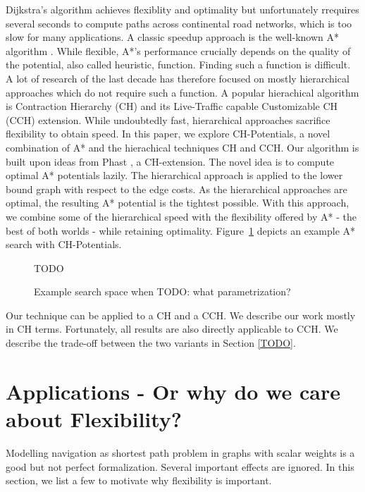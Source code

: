 \documentclass[a4paper,UKenglish,cleveref, autoref]{lipics-v2019}
\begin{document}
Dijkstra's algorithm \cite{?} achieves flexiblity and optimality but unfortunately rrequires several seconds to compute paths across continental road networks, which is too slow for many applications.
A classic speedup approach is the well-known A* algorithm \cite{hnr-afbhd-68}.
While flexible, A*'s performance crucially depends on the quality of the potential, also called heuristic, function.
Finding such a function is difficult.
A lot of research of the last decade has therefore focused on mostly hierarchical approaches \cite{CH,CCH,CRP,HIGHWAYHIERACHIES,MLD} which do not require such a function.
A popular hierachical algorithm is Contraction Hierarchy (CH) \cite{?} and its Live-Traffic capable Customizable CH (CCH) \cite{?} extension.
While undoubtedly fast, hierarchical approaches sacrifice flexibility to obtain speed.
In this paper, we explore CH-Potentials, a novel combination of A* and the hierachical techniques CH and CCH.
Our algorithm is built upon ideas from Phast \cite{?}, a CH-extension.
The novel idea is to compute optimal A* potentials lazily.
The hierarchical approach is applied to the lower bound graph with respect to the edge costs.
As the hierarchical approaches are optimal, the resulting A* potential is the tightest possible.
With this approach, we combine some of the hierarchical speed with the flexibility offered by A* - the best of both worlds - while retaining optimality.
Figure~\ref{img:search-space} depicts an example  A* search with CH-Potentials.

\begin{figure}
TODO

\caption{Example search space when TODO: what parametrization?}
\label{img:search-space}
\end{figure}

Our technique can be applied to a CH and a CCH.
We describe our work mostly in CH terms.
Fortunately, all results are also directly applicable to CCH.
We describe the trade-off between the two variants in Section \ref{TODO}.

\section{Applications - Or why do we care about Flexibility?}

Modelling navigation as shortest path problem in graphs with scalar weights is a good but not perfect formalization.
Several important effects are ignored.
In this section, we list a few to motivate why flexibility is important.
\end{document}
